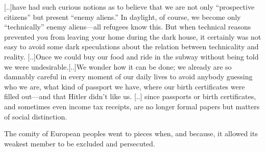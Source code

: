[..]have had such curious notions as to believe that we are not only “prospective citizens” but present “enemy aliens.” In daylight, of course, we become only “technically” enemy aliens—all refugees know this. But when technical reasons prevented you from leaving your home during the dark house, it certainly was not easy to avoid some dark speculations about the relation between technicality and reality.
[..]Once we could buy our food and ride in the subway without being told we were undesirable.[..]We wonder how it can be done; we already are so damnably careful in every moment of our daily lives to avoid anybody guessing who we are, what kind of passport we have, where our birth certificates were filled out—and that Hitler didn’t like us. 
[..] since passports or birth certificates, and sometimes even income tax receipts, are no longer formal papers but matters of social distinction.

The comity of European peoples went to pieces when, and because, it allowed its weakest member to be excluded and persecuted.